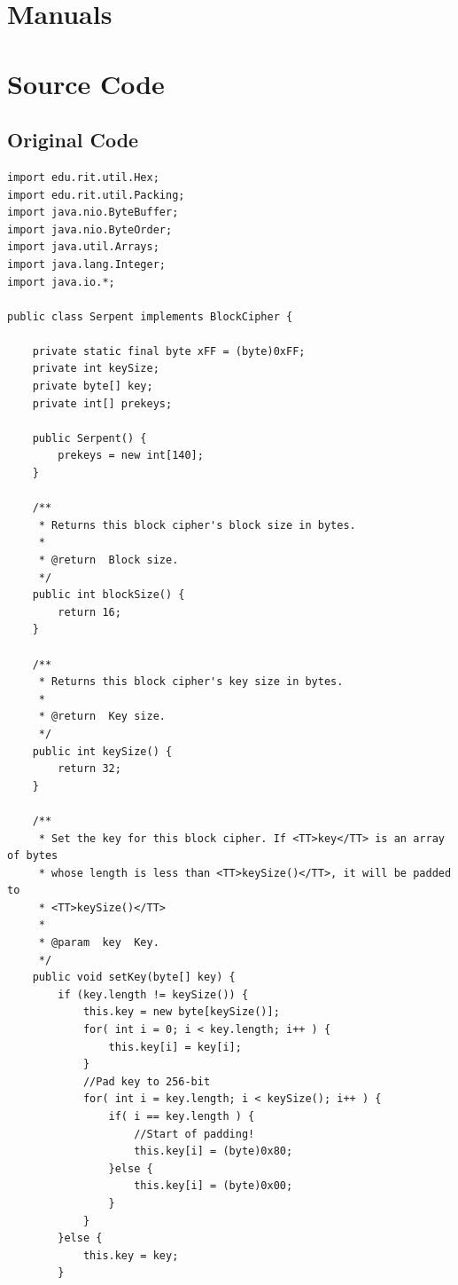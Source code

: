 \documentclass[12pt]{article} %
\begin{document}
\section{Manuals}

\section{Source Code}
\subsection{Original Code}
\begin{lstlisting}
import edu.rit.util.Hex;
import edu.rit.util.Packing;
import java.nio.ByteBuffer;
import java.nio.ByteOrder;
import java.util.Arrays;
import java.lang.Integer;
import java.io.*;

public class Serpent implements BlockCipher {

    private static final byte xFF = (byte)0xFF;
    private int keySize;
    private byte[] key;
    private int[] prekeys;

    public Serpent() {
        prekeys = new int[140];
    }

    /**
     * Returns this block cipher's block size in bytes.
     *
     * @return  Block size.
     */
    public int blockSize() {
        return 16;
    }

    /**
     * Returns this block cipher's key size in bytes.
     *
     * @return  Key size.
     */
    public int keySize() {
        return 32;
    }

    /**
     * Set the key for this block cipher. If <TT>key</TT> is an array of bytes
     * whose length is less than <TT>keySize()</TT>, it will be padded to 
     * <TT>keySize()</TT>
     *
     * @param  key  Key.
     */
    public void setKey(byte[] key) {
        if (key.length != keySize()) {
            this.key = new byte[keySize()];
            for( int i = 0; i < key.length; i++ ) {
                this.key[i] = key[i];
            }
			//Pad key to 256-bit
            for( int i = key.length; i < keySize(); i++ ) {
                if( i == key.length ) {
                    //Start of padding!
                    this.key[i] = (byte)0x80;
                }else {
                    this.key[i] = (byte)0x00;
                }
            }
        }else {
            this.key = key;
        }


\end{lstlisting}
\end{document}
